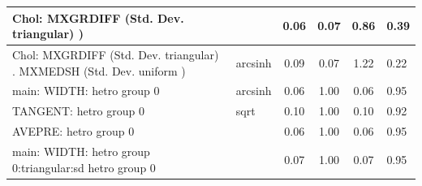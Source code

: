 \begin{table}
\begin{center}
\begin{tabular}{|l|l|c|c|c|l|}
			\hline
			 Chol: MXGRDIFF (Std. Dev. triangular) ) &  & 0.06 & 0.07 & 0.86 & 0.39 \\
			\hline
			 Chol: MXGRDIFF (Std. Dev. triangular) . MXMEDSH (Std. Dev.   uniform ) & arcsinh & 0.09 & 0.07 & 1.22 & 0.22 \\
			\hline
			main: WIDTH: hetro group 0 & arcsinh & 0.06 & 1.00 & 0.06 & 0.95 \\
			\hline
			TANGENT: hetro group 0 & sqrt & 0.10 & 1.00 & 0.10 & 0.92 \\
			\hline
			AVEPRE: hetro group 0 &  & 0.06 & 1.00 & 0.06 & 0.95 \\
			\hline
			main: WIDTH: hetro group 0:triangular:sd  hetro group 0 &  & 0.07 & 1.00 & 0.07 & 0.95 \\
			\hline
		\end{tabular}
	\end{center}
\end{table}